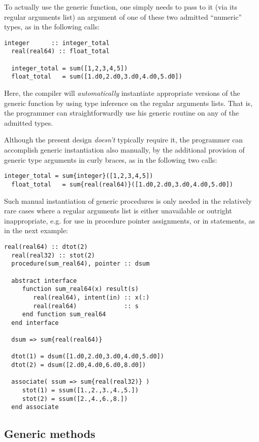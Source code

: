 \documentclass[11pt,oneside]{report}
\newcommand{\code}[1]{{\selectfont\ttfamily{#1}}}
\begin{document}
To actually use the \code{sum} generic function, one simply needs to
pass to it (via its regular arguments list) an argument of one of
these two admitted ``numeric'' types, as in the following calls:
\begin{lstlisting}[language=LFortran,style=boxed]
  integer      :: integer_total
  real(real64) :: float_total
  
  integer_total = sum([1,2,3,4,5])
  float_total   = sum([1.d0,2.d0,3.d0,4.d0,5.d0])
\end{lstlisting}
Here, the compiler will \emph{automatically} instantiate appropriate
versions of the \code{sum} generic function by using type inference on
the regular arguments lists. That is, the programmer can
straightforwardly use his generic routine on any of the admitted
types.

Although the present design \emph{doesn't} typically require it, the
programmer can accomplish generic instantiation also manually, by the
additional provision of generic type arguments in curly braces, as in
the following two calls:
\begin{lstlisting}[language=LFortran,style=boxed]
  integer_total = sum{integer}([1,2,3,4,5])
  float_total   = sum{real(real64)}([1.d0,2.d0,3.d0,4.d0,5.d0])
\end{lstlisting}
Such manual instantiation of generic procedures is only needed in
the relatively rare cases where a regular arguments list is either
unavailable or outright inappropriate, e.g. for use in procedure
pointer assignments, or in \code{associate} statements, as in the next
example:
\begin{lstlisting}[language=LFortran,style=boxed]
  real(real64) :: dtot(2)
  real(real32) :: stot(2)
  procedure(sum_real64), pointer :: dsum

  abstract interface
     function sum_real64(x) result(s)
        real(real64), intent(in) :: x(:)
        real(real64)             :: s
     end function sum_real64  
  end interface
  
  dsum => sum{real(real64)}

  dtot(1) = dsum([1.d0,2.d0,3.d0,4.d0,5.d0])
  dtot(2) = dsum([2.d0,4.d0,6.d0,8.d0])

  associate( ssum => sum{real(real32)} )
     stot(1) = ssum([1.,2.,3.,4.,5.])
     stot(2) = ssum([2.,4.,6.,8.])     
  end associate
\end{lstlisting}

\subsection{Generic methods}
\label{sect:generic_methods}
\end{document}

